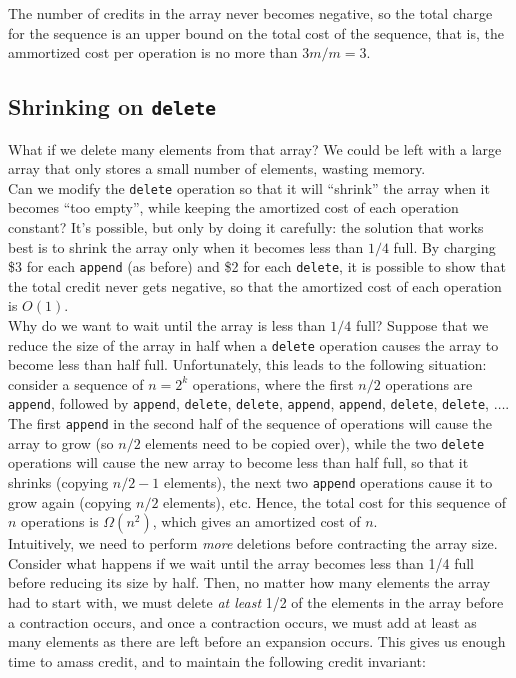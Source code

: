 \noindent The number of credits in the array never becomes negative, so the total charge for the sequence is an upper bound on the total cost of the sequence, that is, the ammortized cost per operation is no more than $3m/m=3$.

\subsection*{Shrinking on \texttt{delete}}

\noindent What if we delete many elements from that array? We could be left with a large array that only stores a small number of elements, wasting memory. \\

\noindent Can we modify the \texttt{delete} operation so that it will ``shrink'' the array when it becomes ``too empty'', while keeping the amortized cost of each operation constant? It's possible, but only by doing it carefully: the solution that works best is to shrink the array only when it becomes less than $1/4$ full. By charging \$3 for each \texttt{append} (as before) and \$2 for each \texttt{delete}, it is possible to show that the total credit never gets negative, so that the amortized cost of each operation is $O(1)$. \\

\noindent Why do we want to wait until the array is less than $1/4$ full? Suppose that we reduce the size of the array in half when a \texttt{delete} operation causes the array to become less than half full. Unfortunately, this leads to the following situation: consider a sequence of $n = 2^k$ operations, where the first $n/2$ operations are \texttt{append}, followed by \texttt{append}, \texttt{delete}, \texttt{delete}, \texttt{append}, \texttt{append}, \texttt{delete}, \texttt{delete}, $\ldots$. The first \texttt{append} in the second half of the sequence of operations will cause the array to grow (so $n/2$ elements need to be copied over), while the two \texttt{delete} operations will cause the new array to become less than half full, so that it shrinks (copying $n/2-1$ elements), the next two \texttt{append} operations cause it to grow again (copying $n/2$ elements), etc. Hence, the total cost for this sequence of $n$ operations is $\Omega(n^2)$, which gives an amortized cost of $n$. \\

\noindent Intuitively, we need to perform \textit{more} deletions before contracting the array size. Consider what happens if we wait until the array becomes less than 1/4 full before reducing its size by half. Then, no matter how many elements the array had to start with, we must delete \textit{at least}  1/2 of the elements in the array before a contraction occurs, and once a contraction occurs, we must add at least as many elements as there are left before an expansion occurs. This gives us enough time to amass credit, and to maintain the following credit invariant: \\

